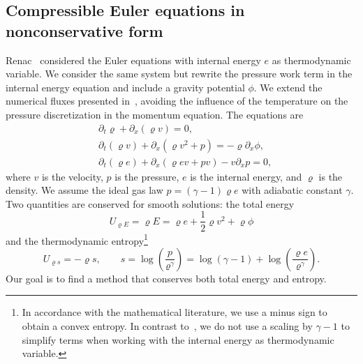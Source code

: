 \documentclass[]{scrartcl}
\theoremstyle{definition}
\begin{document}
\subsection{Compressible Euler equations in nonconservative form}
Renac~\cite{RENAC20191} considered the Euler equations with internal energy $e$ as thermodynamic variable.
We consider the same system but rewrite the pressure work term in the internal energy equation and include a gravity potential $\phi$.
We extend the numerical fluxes presented in~\cite{RENAC20191}, avoiding the influence of the temperature on the pressure discretization in the momentum equation.
The equations are
\begin{equation}
\begin{aligned}
&\partial_t \varrho + \partial_x (\varrho v) = 0,\\
&\partial_t (\varrho v) + \partial_x ( \varrho v^2 + p) = -\varrho \partial_x \phi,\\
&\partial_t ( \varrho e) + \partial_x ( \varrho e v + pv) - v \partial_x p = 0,
\label{euler_noncons}
\end{aligned}
\end{equation}
where $v$ is the velocity, $p$ is the pressure, $e$ is the internal energy, and $\varrho$ is the density.
We assume the ideal gas law $p = (\gamma-1)\varrho e$ with adiabatic constant $\gamma$.
Two quantities are conserved for smooth solutions: the total energy
\begin{equation}
U_{\varrho E} = \varrho E = \varrho e + \frac{1}{2} \varrho v^2+ \varrho \phi
\end{equation}
and the thermodynamic entropy\footnote{In accordance with the mathematical literature, we use a minus sign to obtain a convex entropy. In contrast to~\cite{ismail2009affordable,ECChandra,Ranocha2018}, we do not use a scaling by $\gamma - 1$ to simplify terms when working with the internal energy as thermodynamic variable.}
\begin{equation}
    U_{\varrho s} = -\varrho s,
    \qquad
    s = \log \left ( \frac{p}{\varrho^{\gamma}}\right )
    = \log (\gamma - 1) + \log \left ( \frac{\varrho e }{\varrho^{\gamma}}\right ).
\end{equation}
Our goal is to find a method that conserves both total energy and entropy.
\end{document}

